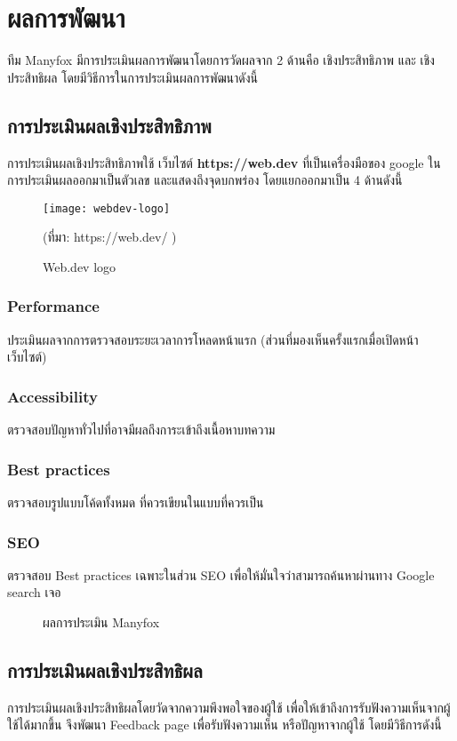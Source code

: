 \chapter{ผลการพัฒนา}
\label{chapter:result}

ทีม Manyfox มีการประเมินผลการพัฒนาโดยการวัดผลจาก 2 ด้านคือ เชิงประสิทธิภาพ และ เชิงประสิทธิผล
โดยมีวิธีการในการประเมินผลการพัฒนาดังนี้

\section{การประเมินผลเชิงประสิทธิภาพ}
การประเมินผลเชิงประสิทธิภาพใช้ เว็บไซต์ \textbf{https://web.dev} ที่เป็นเครื่องมือของ google ในการประเมินผลออกมาเป็นตัวเลข และแสดงถึงจุดบกพร่อง
โดยแยกออกมาเป็น 4 ด้านดังนี้
\begin{figure}[!htbp]
	\centering
	\texttt{[image: webdev-logo]}
	\caption{Web.dev logo}
	(ที่มา:
	https://web.dev/
	)
	\label{Fig:wed-dev}
\end{figure}
\subsection{Performance}
ประเมินผลจากการตรวจสอบระยะเวลาการโหลดหน้าแรก (ส่วนที่มองเห็นครั้งแรกเมื่อเปิดหน้าเว็บไซต์)
\subsection{Accessibility}
ตรวจสอบปัญหาทั่วไปที่อาจมีผลถึงการะเข้าถึงเนื้อหาบทความ
\subsection{Best practices}
ตรวจสอบรูปแบบโค้ดทั้งหมด ที่ควรเขียนในแบบที่ควรเป็น
\subsection{SEO}
ตรวจสอบ Best practices เฉพาะในส่วน SEO เพื่อให้มั่นใจว่าสามารถค้นหาผ่านทาง Google search เจอ
\newpage
\begin{figure}[!htbp]
	\centering
	\caption{ผลการประเมิน Manyfox}

\end{figure}

\section{การประเมินผลเชิงประสิทธิผล}
การประเมินผลเชิงประสิทธิผลโดยวัดจากความพึงพอใจของผู้ใช้ เพื่อให้เข้าถึงการรับฟังความเห็นจากผู้ใช้ได้มากขึ้น จึงพัฒนา Feedback page
เพื่อรับฟังความเห็น หรือปัญหาจากผู้ใช้ โดยมีวิธีการดังนี้
